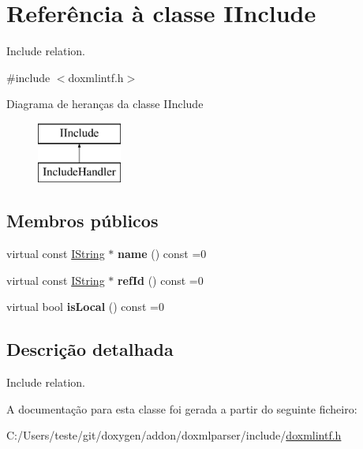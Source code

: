 \hypertarget{class_i_include}{\section{Referência à classe I\-Include}
\label{class_i_include}
}


Include relation.  




{\ttfamily \#include $<$doxmlintf.\-h$>$}

Diagrama de heranças da classe I\-Include\begin{figure}[H]
\begin{center}
\leavevmode
\includegraphics[height=2.000000cm]{class_i_include}
\end{center}
\end{figure}
\subsection*{Membros públicos}
\begin{DoxyCompactItemize}
\item 
\hypertarget{class_i_include_af687440943d0a80c2b38cd5bb51b7a68}{virtual const \hyperlink{class_i_string}{I\-String} $\ast$ {\bfseries name} () const =0}\label{class_i_include_af687440943d0a80c2b38cd5bb51b7a68}

\item 
\hypertarget{class_i_include_a60f519e58362b0fc9165a31c906379e6}{virtual const \hyperlink{class_i_string}{I\-String} $\ast$ {\bfseries ref\-Id} () const =0}\label{class_i_include_a60f519e58362b0fc9165a31c906379e6}

\item 
\hypertarget{class_i_include_abcff9a3274fb91b8427f6badb859e696}{virtual bool {\bfseries is\-Local} () const =0}\label{class_i_include_abcff9a3274fb91b8427f6badb859e696}

\end{DoxyCompactItemize}


\subsection{Descrição detalhada}
Include relation. 

A documentação para esta classe foi gerada a partir do seguinte ficheiro\-:\begin{DoxyCompactItemize}
\item 
C\-:/\-Users/teste/git/doxygen/addon/doxmlparser/include/\hyperlink{include_2doxmlintf_8h}{doxmlintf.\-h}\end{DoxyCompactItemize}
